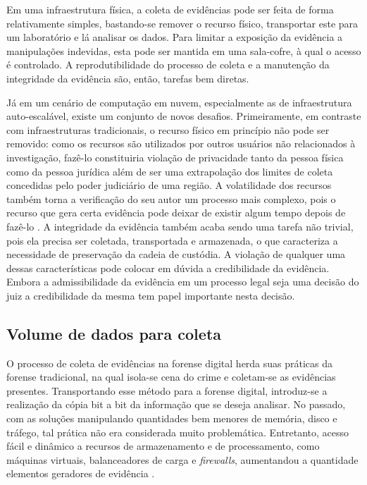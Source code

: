 Em uma infraestrutura física, a coleta de evidências pode ser feita de forma relativamente simples, bastando-se remover o recurso físico, transportar este para um laboratório e lá analisar os dados. 
%
Para limitar a exposição da evidência a manipulações indevidas, esta pode ser mantida em uma sala-cofre, à qual o acesso é controlado.
%
A reprodutibilidade do processo de coleta e a manutenção da integridade da evidência são, então, tarefas bem diretas.


Já em um cenário de computação em nuvem, especialmente as de infraestrutura auto-escalável, existe um conjunto de novos desafios. 
%
Primeiramente, em contraste com infraestruturas tradicionais, o recurso físico em princípio não pode ser removido: como os recursos são utilizados por outros usuários não relacionados à investigação, fazê-lo constituiria violação de privacidade tanto da pessoa física como da pessoa jurídica além de ser uma extrapolação dos limites de coleta concedidas pelo poder judiciário de uma região.
%
A volatilidade dos recursos também torna a verificação do seu autor um processo mais complexo, pois o recurso que gera certa evidência pode deixar de existir algum tempo depois de fazê-lo \cite{SimouCloudChlng:2014}.
%
A integridade da evidência também acaba sendo uma tarefa não trivial, pois ela precisa ser coletada, transportada e armazenada, o que caracteriza a necessidade de preservação da cadeia de custódia.
%
A violação de qualquer uma dessas características pode colocar em dúvida a credibilidade da evidência. Embora a admissibilidade da evidência em um processo legal seja uma decisão do juiz a credibilidade da mesma tem papel importante nesta decisão.


\subsection{Volume de dados para coleta}
\label{sec:volumedados}

O processo de coleta de evidências na forense digital herda suas práticas da forense tradicional, na qual isola-se cena do crime e coletam-se as evidências presentes. 
%
Transportando esse método para a forense digital, introduz-se a realização da cópia bit a bit da informação que se deseja analisar.
%
No passado, com as soluções manipulando quantidades bem menores de memória, disco e tráfego, tal prática não era considerada muito problemática. 
%
Entretanto, acesso fácil e dinâmico a recursos de armazenamento e de processamento, como máquinas virtuais, balanceadores de carga e \textit{firewalls}, aumentandou a quantidade elementos geradores de evidência \cite{WenFAAS:2013}.
%

